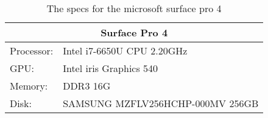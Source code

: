 \begin{table}[]
    \begin{tabular}{ll}
    \hline
    \multicolumn{2}{|c|}{Surface Pro 4}           \\ \hline
    Processor: & Intel i7-6650U CPU 2.20GHz       \\
    GPU:       & Intel iris Graphics 540          \\
    Memory:    & DDR3 16G                         \\
    Disk:      & SAMSUNG MZFLV256HCHP-000MV 256GB
    \end{tabular}
    \caption{The specs for the microsoft surface pro 4}
    \label{tab:surface}
    \end{table} 